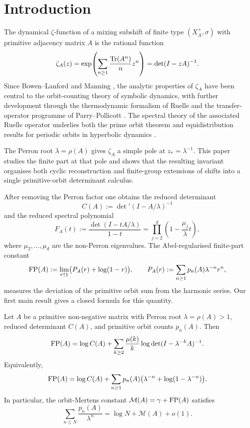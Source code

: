 \section{Introduction}\label{sec:introduction}

The dynamical \(\zeta\)-function of a mixing subshift of finite type
\((X_A^+,\sigma)\) with primitive adjacency matrix \(A\) is the
rational function
\[
  \zeta_A(z)
  =\exp\!\left(\sum_{n\ge 1}\frac{\operatorname{Tr}(A^n)}{n}z^n\right)
  =\det(I-zA)^{-1}.
\]
Since Bowen--Lanford \cite{BowenLanford1970Zeta} and Manning
\cite{Manning1971Axiom}, the analytic properties of \(\zeta_A\) have
been central to the orbit-counting theory of symbolic dynamics, with
further development through the thermodynamic formalism of Ruelle
\cite{Ruelle1976ZetaExpanding,Ruelle1978Thermodynamic} and the
transfer-operator programme of Parry--Pollicott
\cite{ParryPollicott1990Zeta}. The spectral theory of the associated
Ruelle operator underlies both the prime orbit theorem and equidistribution
results for periodic orbits in hyperbolic dynamics
\cite{Baladi2000PositiveTransfer,ParryPollicott1990Zeta}.

The Perron root \(\lambda=\rho(A)\) gives \(\zeta_A\) a simple pole at
\(z_\ast=\lambda^{-1}\). This paper studies the finite part at that
pole and shows that the resulting invariant organises both cyclic
reconstruction and finite-group extensions of shifts into a single
primitive-orbit determinant calculus.

After removing the Perron factor one obtains the reduced determinant
\[
  C(A):=\det\nolimits'(I-A/\lambda)^{-1}
\]
and the reduced spectral polynomial
\[
  F_A(t):=\frac{\det(I-tA/\lambda)}{1-t}
  =\prod_{j=2}^d\left(1-\frac{\mu_j}{\lambda}t\right),
\]
where \(\mu_2,\dots,\mu_d\) are the non-Perron eigenvalues. The
Abel-regularised finite-part constant
\[
  \operatorname{FP}(A):=\lim_{r\uparrow 1}\bigl(P_A(r)+\log(1-r)\bigr),
  \qquad
  P_A(r):=\sum_{n\ge 1}p_n(A)\lambda^{-n}r^n,
\]
measures the deviation of the primitive orbit sum from the harmonic
series. Our first main result gives a closed formula for this quantity.

\begin{theorem}
  \label{thm:intro-finite-part}
  Let \(A\) be a primitive non-negative matrix with Perron root
  \(\lambda=\rho(A)>1\), reduced determinant \(C(A)\), and primitive
  orbit counts \(p_n(A)\). Then
  \[
    \operatorname{FP}(A)
    =\log C(A)
      +\sum_{k\ge 2}\frac{\mu(k)}{k}
        \log\det(I-\lambda^{-k}A)^{-1}.
  \]
  Equivalently,
  \[
    \operatorname{FP}(A)
    =\log C(A)
      +\sum_{n\ge 1}p_n(A)
        \bigl(\lambda^{-n}+\log(1-\lambda^{-n})\bigr).
  \]
  In particular, the orbit-Mertens constant
  \(\mathcal M(A)=\gamma+\operatorname{FP}(A)\) satisfies
  \[
    \sum_{n\le N}\frac{p_n(A)}{\lambda^n}
    =\log N+\mathcal M(A)+o(1).
  \]
\end{theorem}

